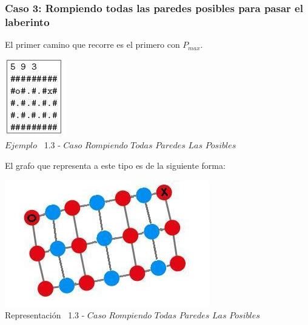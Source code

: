   
\begin{center}
 \subsubsection*{Caso 3: Rompiendo todas las paredes posibles para pasar el laberinto}
\end{center}

El primer camino que recorre es el primero con $P_{max}$.\\
 
\vspace*{0.3cm} \vspace*{0.3cm}
  \begin{center}
 \includegraphics[scale=1.6]{./EJ1/ej1rompertodasparedes.jpeg}
\\ {$Ejemplo$ \ 1.3 - $Caso$ $Rompiendo$ $Todas$ $Paredes$ $Las$ $Posibles$}
  \end{center}
  \vspace*{0.3cm}

El grafo que representa a este tipo es de la siguiente forma:\\

\vspace*{0.3cm} \vspace*{0.3cm}
  \begin{center}
 \includegraphics[scale=0.5]{./EJ1/ej1grafosolucionconpared.jpeg}
 \\{Representaci\'on \ 1.3 - $Caso$ $Rompiendo$ $Todas$ $Paredes$ $Las$ $Posibles$}
  \end{center}
  \vspace*{0.3cm}

